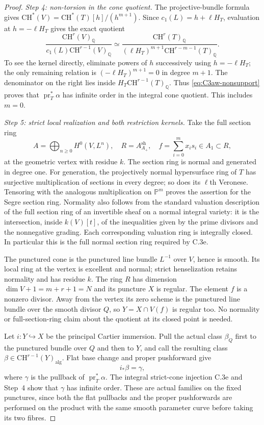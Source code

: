 \begin{proof}
\emph{Step 4: non-torsion in the cone quotient.}
The projective-bundle formula gives
$\mathrm{CH}^*(V)=\mathrm{CH}^*(T)[h]/(h^{m+1})$.
Since $c_1(L)=h+\ell H_T$, evaluation at $h=-\ell H_T$ gives
the exact quotient
\[
 \frac{\mathrm{CH}^r(V)_{\mathbb Q}}
      {c_1(L)\mathrm{CH}^{r-1}(V)_{\mathbb Q}}
 \simeq
 \frac{\mathrm{CH}^r(T)_{\mathbb Q}}
      {(\ell H_T)^{m+1}
                 \mathrm{CH}^{r-m-1}(T)_{\mathbb Q}}.
\]
To see the kernel directly, eliminate powers of $h$ successively
using $h=-\ell H_T$; the only remaining relation is
$(-\ell H_T)^{m+1}=0$ in degree $m+1$. The denominator on the
right lies inside $H_T\mathrm{CH}^{r-1}(T)_{\mathbb Q}$.
Thus \eqref{eq:C3aw-nonsupport} proves that
$\operatorname{pr}_T^*\alpha$ has infinite order in the integral
cone quotient. This includes $m=0$.

\emph{Step 5: strict local realization and both restriction kernels.}
Take the full section ring
\[
 A=\bigoplus_{n\ge0}H^0(V,L^n),
 \quad R=A_{A_+}^{\mathrm{sh}},
 \quad f=\sum_{i=0}^m x_i s_i\in A_1\subset R,
\]
at the geometric vertex with residue $k$.
The section ring is normal and generated in degree one. For generation,
the projectively normal hypersurface ring of $T$ has surjective
multiplication of sections in every degree; so does its $\ell$th
Veronese. Tensoring with the analogous multiplication on
$\mathbb P^m$ proves the assertion for the Segre section ring.
Normality also follows from the standard valuation description of the
full section ring of an invertible sheaf on a normal integral variety:
it is the intersection, inside $k(V)[t]$, of the inequalities given
by the prime divisors and the nonnegative grading. Each corresponding
valuation ring is integrally closed. In particular this is the full
normal section ring required by C.3e.

The punctured cone is the punctured line bundle $L^{-1}$ over $V$,
hence is smooth. Its local ring at the vertex is excellent and normal;
strict henselization retains normality and has residue $k$.
The ring $R$ has dimension $\dim V+1=m+r+1=N$ and its puncture
$X$ is regular. The element $f$ is a nonzero divisor. Away from
the vertex its zero scheme is the punctured line bundle over the
smooth divisor $Q$, so $Y=X\cap V(f)$ is regular too. No normality
or full-section-ring claim about the quotient at its closed point is
needed.

Let $i:Y\hookrightarrow X$ be the principal Cartier immersion.
Pull the actual class $\beta_Q$ first to the punctured bundle over
$Q$ and then to $Y$, and call the resulting class
$\beta\in\mathrm{CH}^{r-1}(Y)_{\mathrm{alg}}$.
Flat base change and proper pushforward give
\[
                   i_*\beta=\gamma,
\]
where $\gamma$ is the pullback of
$\operatorname{pr}_T^*\alpha$. The integral strict-cone injection
C.3e and Step~4 show that $\gamma$ has infinite order. These are
actual families on the fixed punctures, since both the flat pullbacks
and the proper pushforwards are performed on the product with the
same smooth parameter curve before taking its two fibres.


\end{proof}
